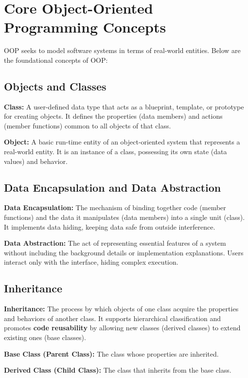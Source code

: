 \documentclass[12pt,a4paper]{article}
\begin{document}
\section{Core Object-Oriented Programming Concepts}

OOP seeks to model software systems in terms of real-world entities. Below are the foundational concepts of OOP:

\subsection{Objects and Classes}
\begin{tcolorbox}[defbox]
\textbf{Class:} A user-defined data type that acts as a blueprint, template, or prototype for creating objects. It defines the properties (data members) and actions (member functions) common to all objects of that class.
\par\vspace{3pt}
\textbf{Object:} A basic run-time entity of an object-oriented system that represents a real-world entity. It is an instance of a class, possessing its own state (data values) and behavior.
\end{tcolorbox}

\subsection{Data Encapsulation and Data Abstraction}
\begin{tcolorbox}[defbox]
\textbf{Data Encapsulation:} The mechanism of binding together code (member functions) and the data it manipulates (data members) into a single unit (class). It implements data hiding, keeping data safe from outside interference.
\par\vspace{3pt}
\textbf{Data Abstraction:} The act of representing essential features of a system without including the background details or implementation explanations. Users interact only with the interface, hiding complex execution.
\end{tcolorbox}

\subsection{Inheritance}
\begin{tcolorbox}[defbox]
\textbf{Inheritance:} The process by which objects of one class acquire the properties and behaviors of another class. It supports hierarchical classification and promotes \textbf{code reusability} by allowing new classes (derived classes) to extend existing ones (base classes).
\par\vspace{3pt}
\textbf{Base Class (Parent Class):} The class whose properties are inherited.
\par\vspace{3pt}
\textbf{Derived Class (Child Class):} The class that inherits from the base class.
\end{tcolorbox}
\end{document}
